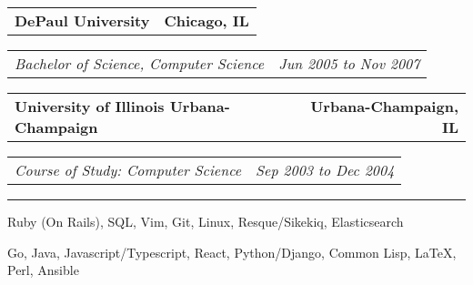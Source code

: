 \documentclass[10pt,letterpaper]{article}
\makeatletter
\newcommand{\headerrow}[2]
{\begin{tabular*}{\linewidth}{l@{\extracolsep{\fill}}r}
  #1 &
  #2 \\
\end{tabular*}}
\newenvironment{indentsection}[1]%
{\begin{list}{}%
  {\setlength{\leftmargin}{#1}}%
  \item[]%
}
{\end{list}}
\makeatother
\begin{document}
\begin{indentsection}{\parindent}
  \headerrow
    {\textbf{DePaul University}}
    {\textbf{Chicago, IL}}
  \vspace{0.1in}
  \headerrow
    {\emph{Bachelor of Science, Computer Science}}
    {\emph{Jun 2005 to Nov 2007}}
  \headerrow
    {\textbf{University of Illinois Urbana-Champaign}}
    {\textbf{Urbana-Champaign, IL}}
  \headerrow
    {\emph{Course of Study: Computer Science}}
    {\emph{Sep 2003 to Dec 2004}}

\end{indentsection}
\vspace{0.1in}
\hrule
\vspace{0.2in}
\begin{indentsection}{\parindent}
\begin{description}
  \item[Languages \& Tools]
  \item Ruby (On Rails), SQL, Vim, Git, Linux, Resque/Sikekiq, Elasticsearch
  \item[Limited Experience]
  \item Go, Java, Javascript/Typescript, React, Python/Django, Common Lisp, \LaTeX, Perl, Ansible
\end{description}
\end{indentsection}
\end{document}
